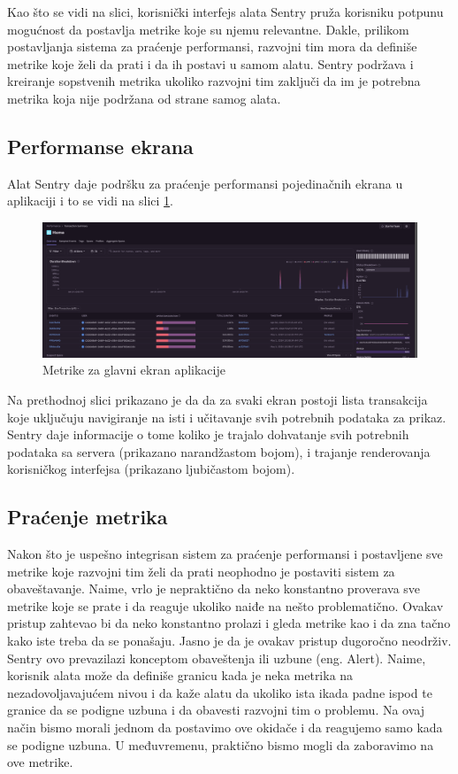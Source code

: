 \documentclass[12pt,oneside]{memoir}
\begin{document}
Kao što se vidi na slici, korisnički interfejs alata Sentry pruža korisniku potpunu mogućnost da postavlja metrike koje su njemu relevantne. Dakle, prilikom postavljanja sistema za praćenje performansi, razvojni tim mora da definiše metrike koje želi da prati i da ih postavi u samom alatu. Sentry podržava i kreiranje sopstvenih metrika ukoliko razvojni tim zaključi da im je potrebna metrika koja nije podržana od strane samog alata. 

\subsection{Performanse ekrana}

Alat Sentry daje podršku za praćenje performansi pojedinačnih ekrana u aplikaciji i to se vidi na slici \ref{fig:mainScreenMetrics}.

\begin{figure}[h]
    \centering
    \includegraphics[scale=0.2]{docs/images/chapterFive/sentryHomeScreen.png}
    \caption{Metrike za glavni ekran aplikacije}
    \label{fig:mainScreenMetrics}
\end{figure}

Na prethodnoj slici prikazano je da da za svaki ekran postoji lista transakcija koje uključuju navigiranje na isti i učitavanje svih potrebnih podataka za prikaz. Sentry daje informacije o tome koliko je trajalo dohvatanje svih potrebnih podataka sa servera (prikazano narandžastom bojom), i trajanje renderovanja korisničkog interfejsa (prikazano ljubičastom bojom).

\subsection{Praćenje metrika}

Nakon što je uspešno integrisan sistem za praćenje performansi i postavljene sve metrike koje razvojni tim želi da prati neophodno je postaviti sistem za obaveštavanje. Naime, vrlo je nepraktično da neko konstantno proverava sve metrike koje se prate i da reaguje ukoliko naiđe na nešto problematično. Ovakav pristup zahtevao bi da neko konstantno prolazi i gleda metrike kao i da zna tačno kako iste treba da se ponašaju. Jasno je da je ovakav pristup dugoročno neodrživ. Sentry ovo prevazilazi konceptom obaveštenja ili uzbune (eng. Alert). Naime, korisnik alata može da definiše granicu kada je neka metrika na nezadovoljavajućem nivou i da kaže alatu da ukoliko ista ikada padne ispod te granice da se podigne uzbuna i da obavesti razvojni tim o problemu. Na ovaj način bismo morali jednom da postavimo ove okidače i da reagujemo samo kada se podigne uzbuna. U međuvremenu, praktično bismo mogli da zaboravimo na ove metrike.
\end{document}

